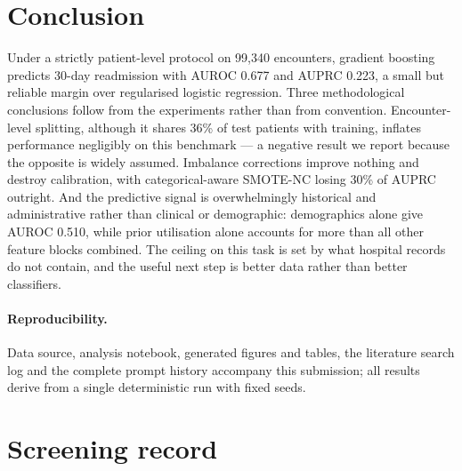 \documentclass[runningheads]{llncs}
\begin{document}
\section{Conclusion}

Under a strictly patient-level protocol on 99{,}340 encounters, gradient boosting
predicts 30-day readmission with AUROC 0.677 and AUPRC 0.223, a small but reliable
margin over regularised logistic regression. Three methodological conclusions follow
from the experiments rather than from convention. Encounter-level splitting, although
it shares 36\% of test patients with training, inflates performance negligibly on this
benchmark --- a negative result we report because the opposite is widely assumed.
Imbalance corrections improve nothing and destroy calibration, with categorical-aware
SMOTE-NC losing 30\% of AUPRC outright. And the predictive signal is overwhelmingly
historical and administrative rather than clinical or demographic: demographics alone
give AUROC 0.510, while prior utilisation alone accounts for more than all other
feature blocks combined. The ceiling on this task is set by what hospital records do
not contain, and the useful next step is better data rather than better classifiers.

\paragraph{Reproducibility.} Data source, analysis notebook, generated figures and
tables, the literature search log and the complete prompt history accompany this
submission; all results derive from a single deterministic run with fixed seeds.

\clearpage



\clearpage
\appendix
\section{Screening record}
\label{app:screening}

\end{document}
